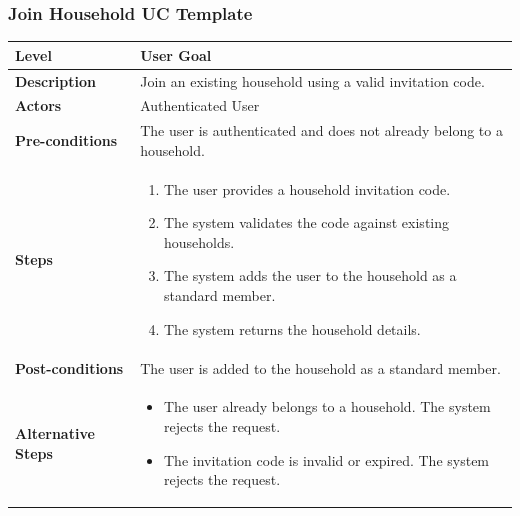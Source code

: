 \subsubsection{Join Household UC Template}
\begin{longtable}{|p{3.5cm}|p{10.3cm}|}
\hline
\rowcolor{UCRow} \textbf{Level} & User Goal \\ \hline
\textbf{Description} & Join an existing household using a valid invitation code. \\ \hline
\rowcolor{UCRow} \textbf{Actors} & Authenticated User \\ \hline
\textbf{Pre-conditions} & The user is authenticated and does not already belong to a household. \\ \hline
\rowcolor{UCRow} \textbf{Steps} &
\begin{enumerate}[nosep, leftmargin=*]
    \item The user provides a household invitation code.
    \item The system validates the code against existing households.
    \item The system adds the user to the household as a standard member.
    \item The system returns the household details.
\end{enumerate} \\ \hline
\textbf{Post-conditions} & The user is added to the household as a standard member. \\ \hline
\rowcolor{UCRow} \textbf{Alternative Steps} &
\begin{itemize}[nosep, leftmargin=2.5em]
    \item[\textbf{A1.}] The user already belongs to a household. The system rejects the request.
    \item[\textbf{A2.}] The invitation code is invalid or expired. The system rejects the request.
\end{itemize} \\ \hline
\end{longtable}

